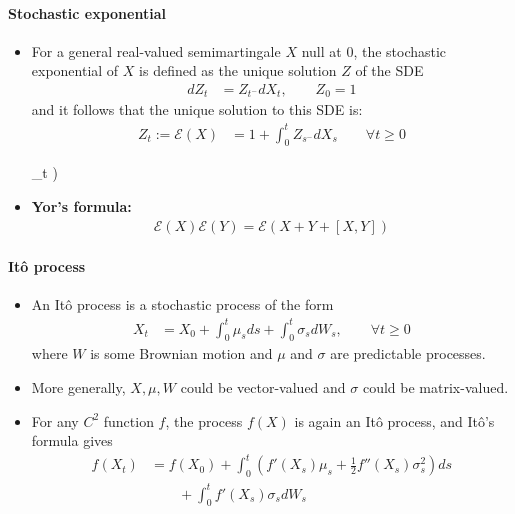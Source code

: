 \documentclass[a4paper,landscape,8pt,fleqn]{scrartcl}
\newcommand*\widefbox[1]{\fbox{\hspace{2em}#1\hspace{2em}}}		%
\renewcommand{\emph}[1]{\textbf{#1}}
\begin{document}
\begin{multicols*}{3}
\paragraph{Stochastic exponential}

\begin{itemize}
\item For a general real-valued semimartingale $X$ null at 0, the stochastic exponential of $X$ is defined as the unique solution $Z$ of the SDE
\begin{align*}
dZ_t &= Z_{t^-} dX_t, \qquad Z_0 = 1
\end{align*}
and it follows that the unique solution to this SDE is:
\begin{align*}
Z_t := \mathcal{E}(X) &= 1 + \int_0^t Z_{s^-} dX_s \qquad \forall t \geq 0
\end{align*}
\begin{empheq}[box=\widefbox]{align*}
\mathcal{E}(X)_t &= \exp \left( X_t - \frac{1}{2} [X]_t \right)
\end{empheq}
\item \emph{Yor's formula:}
\begin{align*}
\mathcal{E}(X) \mathcal{E}(Y) = \mathcal{E}(X+Y+[X,Y])
\end{align*}
\end{itemize}

\paragraph{Itô process}

\begin{itemize}
\item An Itô process is a stochastic process of the form
\begin{align*}
X_t &= X_0 + \int_0^t \mu_s ds + \int_0^t \sigma_s dW_s, \qquad \forall t \geq 0
\end{align*}
where $W$ is some Brownian motion and $\mu$ and $\sigma$ are predictable processes.
\item More generally, $X, \mu, W$ could be vector-valued and $\sigma$ could be matrix-valued.
\item For any $C^2$ function $f$, the process $f(X)$ is again an Itô process, and Itô's formula gives
\begin{align*}
f(X_t) &= f(X_0) + \int_0^t \left( f'(X_s) \mu_s + \frac{1}{2} f''(X_s) \sigma_s^2 \right) ds \\
& \qquad + \int_0^t f'(X_s) \sigma_s dW_s
\end{align*}
\end{itemize}


\end{multicols*}
\end{document}
